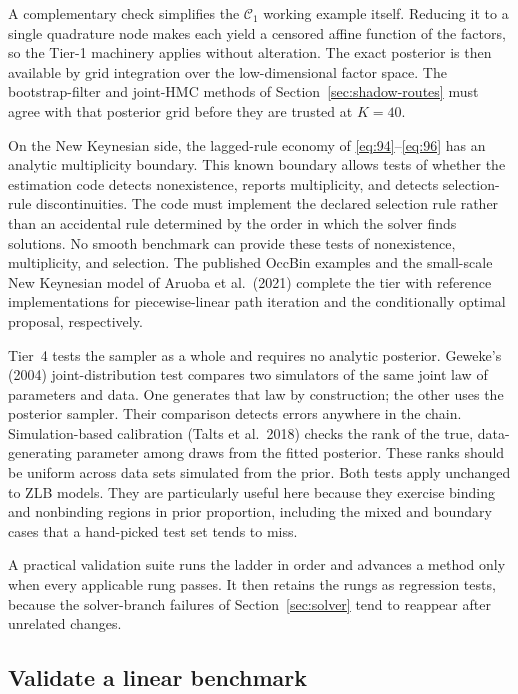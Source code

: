 \documentclass[11pt]{article}
\begin{document}
A complementary check simplifies the $\mathcal C_1$ working example itself. Reducing it to a single quadrature node makes each yield a censored affine function of the factors, so the Tier-1 machinery applies without alteration. The exact posterior is then available by grid integration over the low-dimensional factor space. The bootstrap-filter and joint-HMC methods of Section~\ref{sec:shadow-routes} must agree with that posterior grid before they are trusted at $K=40$.

On the New Keynesian side, the lagged-rule economy of \eqref{eq:94}--\eqref{eq:96} has an analytic multiplicity boundary. This known boundary allows tests of whether the estimation code detects nonexistence, reports multiplicity, and detects selection-rule discontinuities. The code must implement the declared selection rule rather than an accidental rule determined by the order in which the solver finds solutions. No smooth benchmark can provide these tests of nonexistence, multiplicity, and selection. The published OccBin examples and the small-scale New Keynesian model of Aruoba et al.\ (2021) complete the tier with reference implementations for piecewise-linear path iteration and the conditionally optimal proposal, respectively.

Tier~4 tests the sampler as a whole and requires no analytic posterior. Geweke's (2004) joint-distribution test compares two simulators of the same joint law of parameters and data. One generates that law by construction; the other uses the posterior sampler. Their comparison detects errors anywhere in the chain. Simulation-based calibration (Talts et al.\ 2018) checks the rank of the true, data-generating parameter among draws from the fitted posterior. These ranks should be uniform across data sets simulated from the prior. Both tests apply unchanged to ZLB models. They are particularly useful here because they exercise binding and nonbinding regions in prior proportion, including the mixed and boundary cases that a hand-picked test set tends to miss.

A practical validation suite runs the ladder in order and advances a method only when every applicable rung passes. It then retains the rungs as regression tests, because the solver-branch failures of Section~\ref{sec:solver} tend to reappear after unrelated changes.

\subsection*{Validate a linear benchmark}
\end{document}
